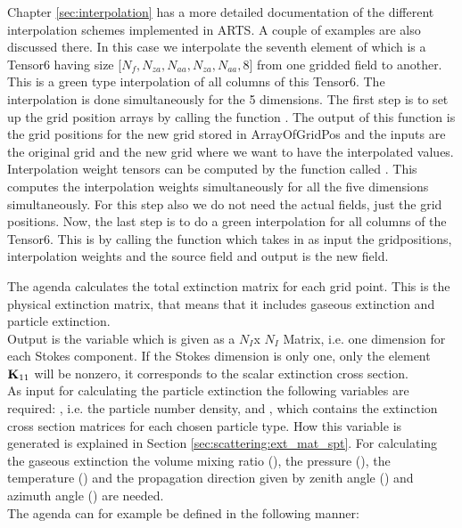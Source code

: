 Chapter \ref{sec:interpolation} has a more
detailed documentation of the different interpolation schemes
implemented in ARTS. A couple of examples are also discussed there.
In this case we interpolate the seventh element of
 which is a Tensor6 having size
[$N_{f}, N_{za}, N_{aa}, N_{za}, N_{aa}, 8$] from one gridded field to
another.  This is a green type interpolation of all columns of this
Tensor6.  The interpolation is done simultaneously for the 5 dimensions.
The first step is to set up the grid position arrays by calling the
function .  The output of this function is the grid
positions for the new grid stored in ArrayOfGridPos and the inputs are
the original grid and the new grid where we want to have the
interpolated values. Interpolation weight tensors can be computed by
the function called .  This computes the
interpolation weights simultaneously for all the five dimensions
simultaneously. For this step also we do not need the actual fields,
just the grid positions. Now, the last step is to do a green
interpolation for all columns of the Tensor6.  This is by calling the
function  which takes in as input the
gridpositions, interpolation weights and the source field and output
is the new field.  

\label{sec:scattering:gen_ext}

\label{sec:scattering:ext_mat_agenda}

The agenda  calculates the total extinction
matrix \ExtMat{}
for each grid point. This is the physical extinction matrix, that means
that it includes gaseous extinction and particle
extinction.\\
Output is the variable  which is given
as a $N_I$x $N_I$ Matrix, i.e. one dimension for each Stokes component. If the
Stokes dimension is only one, only the element ${\bf K}_{11}$ will be
nonzero, it corresponds to the scalar extinction cross section. \\
As input for calculating the particle extinction the following
variables are required:
, i.e. the particle number density, and 
, which contains the extinction cross section
matrices for each chosen particle type. How this variable is generated
is explained in Section \ref{sec:scattering:ext_mat_spt}. For calculating the
gaseous extinction the volume mixing ratio (), the
pressure (), the temperature  () and the
propagation direction given by zenith angle () and
azimuth angle () are needed.\\
The agenda can for example be defined in the following manner:

